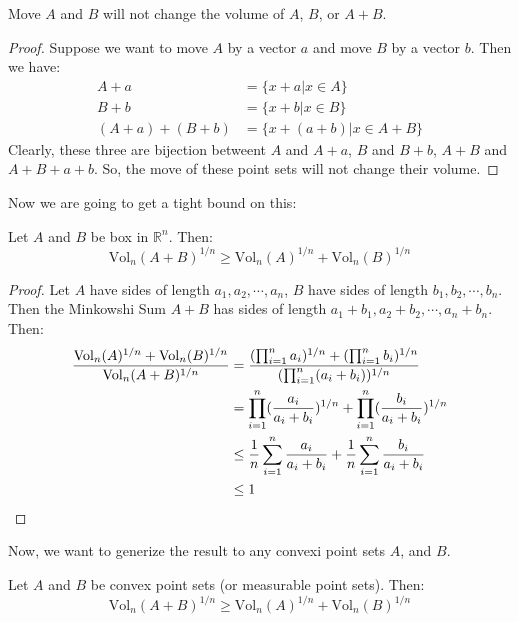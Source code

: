 \begin{fact}
  Move $A$ and $B$ will not change the volume of $A$, $B$, or $A + B$.
\end{fact}
\begin{proof}
  Suppose we want to move $A$ by a vector $a$ and move $B$ by a vector $b$. Then we have:
  \begin{align*}
    A + a &= \{x + a | x \in A\} \\
    B + b &= \{x + b | x \in B\} \\
    (A + a) + (B + b) &= \{x + (a + b)| x \in A + B\}
  \end{align*}
  Clearly, these three are bijection betweent $A$ and $A+a$, $B$ and $B+b$, $A + B$ and $A + B + a + b$.
  So, the move of these point sets will not change their volume.
\end{proof}
Now we are going to get a tight bound on this:
\begin{lemma}
  Let $A$ and $B$ be box in $\mathbb{R}^n$. Then:
  \[
    \mathrm{Vol}_n(A + B)^{1/n} \geq \mathrm{Vol}_n(A)^{1/n} + \mathrm{Vol}_n(B)^{1/n}
  \]
\end{lemma}
\begin{proof}
  Let $A$ have sides of length $a_1, a_2, \cdots, a_n$, $B$ have sides of length $b_1, b_2, \cdots, b_n$. Then the Minkowshi Sum $A + B$ has sides of length $a_1 + b_1, a_2 + b_2, \cdots, a_n + b_n$. Then:
  \begin{align*}
    \frac{\mathrm{Vol}_n(A)^{1/n} + \mathrm{Vol}_n(B)^{1/n}}{\mathrm{Vol}_n(A + B)^{1/n}} &= \frac{(\prod_{i=1}^n a_i)^{1/n} + (\prod_{i=1}^n b_i)^{1/n}}{(\prod_{i=1}^n (a_i + b_i))^{1/n}} \\
    &= \prod_{i=1}^n (\frac{a_i}{a_i + b_i})^{1/n} + \prod_{i=1}^n (\frac{b_i}{a_i + b_i})^{1/n} \\
    &\leq \frac{1}{n}\sum_{i=1}^n \frac{a_i}{a_i + b_i} + \frac{1}{n}\sum_{i=1}^n \frac{b_i}{a_i + b_i} \\
    &\leq 1 \qedhere
  \end{align*}
\end{proof}
Now, we want to generize the result to any convexi point sets $A$, and $B$.
\begin{theorem}
  Let $A$ and $B$ be convex point sets (or measurable point sets). Then:
  \[
    \mathrm{Vol}_n(A + B)^{1/n} \geq \mathrm{Vol}_n(A)^{1/n} + \mathrm{Vol}_n(B)^{1/n}
  \]
\end{theorem}
